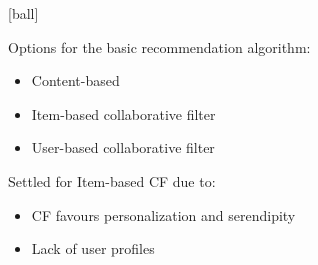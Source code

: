 
    [ball]

    Options for the basic recommendation algorithm:

    \begin{itemize}
        \item Content-based
        \item Item-based collaborative filter
        \item User-based collaborative filter
    \end{itemize}

    \vspace{2ex}

    Settled for Item-based CF due to:
    \begin{itemize}
        \item CF favours personalization and serendipity
        \item Lack of user profiles
    \end{itemize}